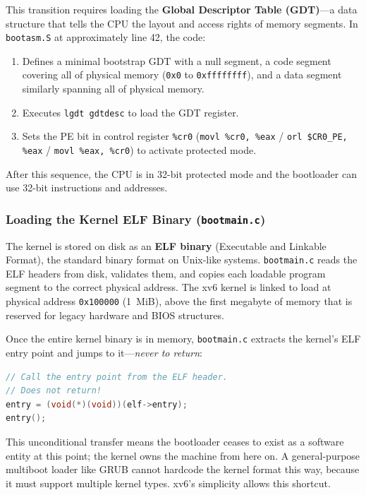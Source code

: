 \documentclass[11pt]{article}
\begin{document}
This transition requires loading the \textbf{Global Descriptor Table (GDT)}---a data structure that tells the CPU the layout and access rights of memory segments. In \texttt{bootasm.S} at approximately line 42, the code:
\begin{enumerate}
    \item Defines a minimal bootstrap GDT with a null segment, a code segment covering all of physical memory (\texttt{0x0} to \texttt{0xffffffff}), and a data segment similarly spanning all of physical memory.
    \item Executes \texttt{lgdt gdtdesc} to load the GDT register.
    \item Sets the PE bit in control register \texttt{\%cr0} (\texttt{movl \%cr0, \%eax} / \texttt{orl \$CR0\_PE, \%eax} / \texttt{movl \%eax, \%cr0}) to activate protected mode.
\end{enumerate}

After this sequence, the CPU is in 32-bit protected mode and the bootloader can use 32-bit instructions and addresses.

\subsubsection*{Loading the Kernel ELF Binary (\texttt{bootmain.c})}

The kernel is stored on disk as an \textbf{ELF binary} (Executable and Linkable Format), the standard binary format on Unix-like systems. \texttt{bootmain.c} reads the ELF headers from disk, validates them, and copies each loadable program segment to the correct physical address. The xv6 kernel is linked to load at physical address \texttt{0x100000} (1~MiB), above the first megabyte of memory that is reserved for legacy hardware and BIOS structures.

Once the entire kernel binary is in memory, \texttt{bootmain.c} extracts the kernel's ELF entry point and jumps to it---\emph{never to return}:

\begin{lstlisting}[language=C, caption={bootmain.c:47 --- jumping into the kernel}]
// Call the entry point from the ELF header.
// Does not return!
entry = (void(*)(void))(elf->entry);
entry();
\end{lstlisting}

This unconditional transfer means the bootloader ceases to exist as a software entity at this point; the kernel owns the machine from here on. A general-purpose multiboot loader like GRUB cannot hardcode the kernel format this way, because it must support multiple kernel types. xv6's simplicity allows this shortcut.
\end{document}
